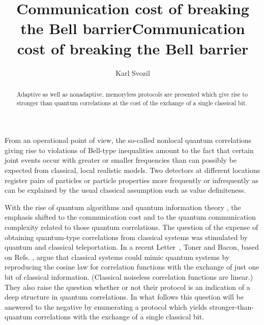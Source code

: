\documentclass[prl,showpacs,showkeys,amsfonts,preprint]{revtex4}
\begin{document}
\title{\bf Communication cost of breaking the Bell barrier}


\coverpage



\title{Communication cost of breaking the Bell barrier}

\author{Karl Svozil}


\begin{abstract}
Adaptive as well as nonadaptive, memoryless protocols are presented which give rise to stronger than quantum correlations at the cost of the exchange of a single classical bit.
\end{abstract}






\maketitle


From an operational point of view,
the so-called nonlocal quantum correlations giving rise to
violations of Bell-type inequalities amount to the fact that
certain joint events occur with greater or smaller frequencies than can possibly be
expected from classical, local realistic models.
Two detectors at different locations register pairs
of particles or particle properties
more frequently or infrequently as can be explained by
the usual classical assumption such as value definiteness.

With the rise of quantum algorithms and quantum information theory
\cite{nielsen-book},
the emphasis shifted to the communication cost and to the quantum communication complexity
related to those quantum correlations.
The question of the expense of obtaining quantum-type correlations
from classical systems was stimulated by quantum
\cite{BBCJPW}
and classical \cite{Brassard-Cleve-Tapp,cerf-gisin-massar-00,cerf-gisin-massar-pop-04,bru-gis-sca-04}
teleportation.
In a recent Letter~\cite{toner-bacon-03}, Toner and Bacon,
based on Refs. \cite{schatten-93,cerf-gisin-massar-00}, argue
that classical systems could mimic quantum systems by reproducing the
cosine law for correlation functions with the exchange of just one bit of classical information.
(Classical noiseless correlation functions are linear.)
They also raise the question whether or not their protocol is
an indication of a deep structure in quantum correlations.
In what follows this question will be answered to the negative by enumerating
a protocol which yields stronger-than-quantum correlations with the exchange of a single classical bit.
\end{document}
